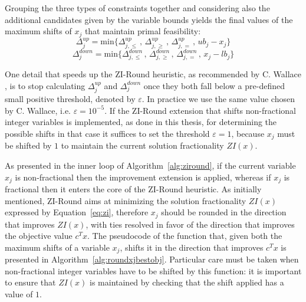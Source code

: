 \documentclass[a4paper,12pt]{book}
\begin{document}
Grouping the three types of constraints together and considering also the additional candidates given by the variable bounds yields the final values of the maximum shifts of $x_j$ that maintain primal feasibility:
\begin{equation}
	\Delta_{j}^{up} = \text{min} \{\Delta_{j,\leq}^{up} \,,\, \Delta_{j,\geq}^{up} \,,\, \Delta_{j,=}^{up} \,,\, ub_j - x_j\}
\end{equation}
\begin{equation}
	\Delta_{j}^{down} = \text{min} \{\Delta_{j,\leq}^{down} \,,\, \Delta_{j,\geq}^{down} \,,\, \Delta_{j,=}^{down} \,,\, x_j - lb_j\}
\end{equation}

One detail that speeds up the ZI-Round heuristic, as recommended by C. Wallace \cite{wallace2010}, is to stop calculating $\Delta_{j}^{up}$ and $\Delta_{j}^{down}$ once they both fall below a pre-defined small positive threshold, denoted by $\varepsilon$. In practice we use the same value chosen by C. Wallace, i.e. $\varepsilon = 10^{-5}$. If the ZI-Round extension that shifts non-fractional integer variables is implemented, as done in this thesis, for determining the possible shifts in that case it suffices to set the threshold $\varepsilon = 1$, because $x_j$ must be shifted by $1$ to maintain the current solution fractionality $ZI(x)$. \par 

As presented in the inner loop of Algorithm~\ref{alg:ziround}, if the current variable $x_j$ is non-fractional then the improvement extension is applied, whereas if $x_j$ is fractional then it enters the core of the ZI-Round heuristic. As initially mentioned, ZI-Round aims at minimizing the solution fractionality $ZI(x)$ expressed by Equation~\ref{eq:zi}, therefore $x_j$ should be rounded in the direction that improves $ZI(x)$, with ties resolved in favor of the direction that improves the objective value $c^Tx$. The pseudocode of the function that, given both the maximum shifts of a variable $x_j$, shifts it in the direction that improves $c^Tx$ is presented in Algorithm~\ref{alg:roundxjbestobj}. Particular care must be taken when non-fractional integer variables have to be shifted by this function: it is important to ensure that $ZI(x)$ is maintained by checking that the shift applied has a value of $1$. \par
\end{document}
